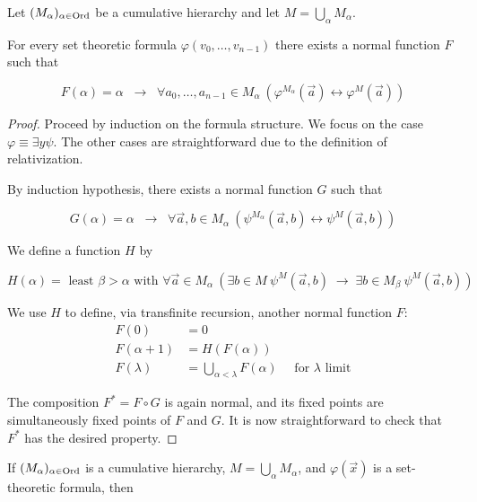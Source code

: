 \begin{theorem}\label{thm-reflection}Let $(M_\alpha)_{\alpha \in \operatorname{Ord}}$ be a cumulative hierarchy and let $M = \bigcup_\alpha M_\alpha$.

For every set theoretic formula $\varphi(v_0, \dots, v_{n -1})$ there exists a normal function $F$ such that

\begin{equation}
F(\alpha) = \alpha \; \; \rightarrow \;\;  \forall a_0, \dots, a_{n-1} \in M_\alpha \: (\varphi^{M_\alpha}(\vec{a}) \leftrightarrow \varphi^{M}(\vec{a}))
\end{equation}

\end{theorem}\begin{proof}Proceed by induction on the formula structure. We focus on the case $\varphi \equiv \exists y \psi$. The other cases are straightforward due to the definition of relativization.

By induction hypothesis, there exists a normal function $G$ such that

\begin{equation}
G(\alpha) = \alpha \; \; \rightarrow \;\;  \forall \vec{a},b \in M_\alpha \: (\psi^{M_\alpha}(\vec{a},b) \leftrightarrow \psi^{M}(\vec{a},b))
\end{equation}

We define a function $H$ by

\begin{equation}
H(\alpha) = \text{ least } \beta > \alpha \text{ with } \forall \vec{a} \in M_\alpha \: ( \exists b \in M \: \psi^M(\vec{a},b) \; \rightarrow \; \exists b \in M_\beta \: \psi^M(\vec{a},b))
\end{equation}

We use $H$ to define, via transfinite recursion, another normal function $F$:
\begin{align*}
	F(0) & = 0 \\
	F(\alpha+1) & = H(F(\alpha)) \\
	F(\lambda) & = \bigcup_{\alpha < \lambda} F(\alpha) \quad \text{ for $\lambda$ limit}
\end{align*}

The composition $F^* = F\circ G$ is again normal, and its fixed points are simultaneously fixed points of $F$ and $G$. It is now straightforward to check  that $F^*$ has the desired property.

\end{proof}\begin{corollary}\label{cor-scott-scarpellini}If $(M_\alpha)_{\alpha \in \operatorname{Ord}}$ is a cumulative hierarchy, $M = \bigcup_\alpha M_\alpha$, and $\varphi(\vec{x})$ is a set-theoretic formula, then


\end{corollary}
